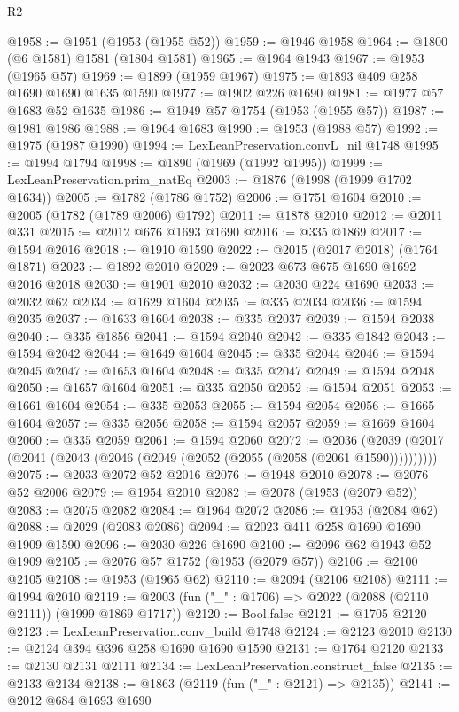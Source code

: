 \begin{lexlean}{R2}
\begin{coremodule}
@1958 := @1951 (@1953 (@1955 @52))
@1959 := @1946 @1958
@1964 := @1800 (@6 @1581) @1581 (@1804 @1581)
@1965 := @1964 @1943
@1967 := @1953 (@1965 @57)
@1969 := @1899 (@1959 @1967)
@1975 := @1893 @409 @258 @1690 @1690 @1635 @1590
@1977 := @1902 @226 @1690
@1981 := @1977 @57 @1683 @52 @1635
@1986 := @1949 @57 @1754 (@1953 (@1955 @57))
@1987 := @1981 @1986
@1988 := @1964 @1683
@1990 := @1953 (@1988 @57)
@1992 := @1975 (@1987 @1990)
@1994 := LexLeanPreservation.convL_nil @1748
@1995 := @1994 @1794
@1998 := @1890 (@1969 (@1992 @1995))
@1999 := LexLeanPreservation.prim_natEq
@2003 := @1876 (@1998 (@1999 @1702 @1634))
@2005 := @1782 (@1786 @1752)
@2006 := @1751 @1604
@2010 := @2005 (@1782 (@1789 @2006) @1792)
@2011 := @1878 @2010
@2012 := @2011 @331
@2015 := @2012 @676 @1693 @1690
@2016 := @335 @1869
@2017 := @1594 @2016
@2018 := @1910 @1590
@2022 := @2015 (@2017 @2018) (@1764 @1871)
@2023 := @1892 @2010
@2029 := @2023 @673 @675 @1690 @1692 @2016 @2018
@2030 := @1901 @2010
@2032 := @2030 @224 @1690
@2033 := @2032 @62
@2034 := @1629 @1604
@2035 := @335 @2034
@2036 := @1594 @2035
@2037 := @1633 @1604
@2038 := @335 @2037
@2039 := @1594 @2038
@2040 := @335 @1856
@2041 := @1594 @2040
@2042 := @335 @1842
@2043 := @1594 @2042
@2044 := @1649 @1604
@2045 := @335 @2044
@2046 := @1594 @2045
@2047 := @1653 @1604
@2048 := @335 @2047
@2049 := @1594 @2048
@2050 := @1657 @1604
@2051 := @335 @2050
@2052 := @1594 @2051
@2053 := @1661 @1604
@2054 := @335 @2053
@2055 := @1594 @2054
@2056 := @1665 @1604
@2057 := @335 @2056
@2058 := @1594 @2057
@2059 := @1669 @1604
@2060 := @335 @2059
@2061 := @1594 @2060
@2072 := @2036 (@2039 (@2017 (@2041 (@2043 (@2046 (@2049 (@2052 (@2055 (@2058 (@2061 @1590))))))))))
@2075 := @2033 @2072 @52 @2016
@2076 := @1948 @2010
@2078 := @2076 @52 @2006
@2079 := @1954 @2010
@2082 := @2078 (@1953 (@2079 @52))
@2083 := @2075 @2082
@2084 := @1964 @2072
@2086 := @1953 (@2084 @62)
@2088 := @2029 (@2083 @2086)
@2094 := @2023 @411 @258 @1690 @1690 @1909 @1590
@2096 := @2030 @226 @1690
@2100 := @2096 @62 @1943 @52 @1909
@2105 := @2076 @57 @1752 (@1953 (@2079 @57))
@2106 := @2100 @2105
@2108 := @1953 (@1965 @62)
@2110 := @2094 (@2106 @2108)
@2111 := @1994 @2010
@2119 := @2003 (fun ("_" : @1706) => @2022 (@2088 (@2110 @2111)) (@1999 @1869 @1717))
@2120 := Bool.false
@2121 := @1705 @2120
@2123 := LexLeanPreservation.conv_build @1748
@2124 := @2123 @2010
@2130 := @2124 @394 @396 @258 @1690 @1690 @1590
@2131 := @1764 @2120
@2133 := @2130 @2131 @2111
@2134 := LexLeanPreservation.construct_false
@2135 := @2133 @2134
@2138 := @1863 (@2119 (fun ("_" : @2121) => @2135))
@2141 := @2012 @684 @1693 @1690

\end{coremodule}
\end{lexlean}
